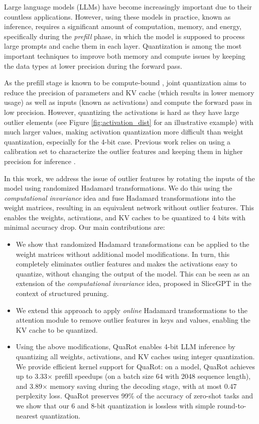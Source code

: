 
Large language models (LLMs) have become increasingly important due to their countless applications. However, using these models in practice, known as inference, requires a significant amount of computation, memory, and energy, specifically during the \textit{prefill} phase, in which the model is supposed to process large prompts and cache them in each layer. Quantization is among the most important techniques to improve both memory and compute issues by keeping the data types at lower precision during the forward pass.


 As the prefill stage is known to be compute-bound \citep{quik}, joint quantization aims to reduce the precision of parameters and KV cache (which results in lower memory usage) as well as inputs (known as activations) and compute the forward pass in low precision. However, quantizing the activations is hard as they have large outlier elements (see Figure \ref{fig:activation_dist} for an illustrative example) with much larger values, making activation quantization more difficult than weight quantization, especially for the 4-bit case. Previous work relies on using a calibration set to characterize the outlier features and keeping them in higher precision for inference \citep{atom, quik}.


In this work, we address the issue of outlier features by rotating the inputs of the model using randomized Hadamard transformations. We do this using the \textit{computational invariance} idea \citep{slicegpt} and fuse Hadamard transformations into the weight matrices, resulting in an equivalent network without outlier features. This enables the weights, activations, and KV caches to be quantized to 4 bits with minimal accuracy drop. Our main contributions are:

\begin{itemize}
    \item We show that randomized Hadamard transformations can be applied to the weight matrices without additional model modifications. In turn, this completely eliminates outlier features and makes the activations easy to quantize, without changing the output of the model. This can be seen as an extension of the  \textit{computational invariance} idea, proposed in SliceGPT \citep{slicegpt} in the context of structured pruning. 
    \item We extend this approach to apply \emph{online} Hadamard transformations to the attention module to remove outlier features in keys and values, enabling the KV cache to be quantized.
    \item Using the above modifications, QuaRot enables 4-bit LLM inference by quantizing all weights, activations, and KV caches using integer quantization. 
    We provide efficient kernel support for QuaRot: on a \llamaBig model, QuaRot achieves up to 3.33$\times$ prefill speedups (on a batch size 64 with 2048 sequence length), and 3.89$\times$ memory saving during the decoding stage, with at most 0.47 \wiki perplexity loss. QuaRot preserves 99\% of the accuracy of zero-shot tasks and we show that our 6 and 8-bit quantization is lossless with simple round-to-nearest quantization.
\end{itemize}

